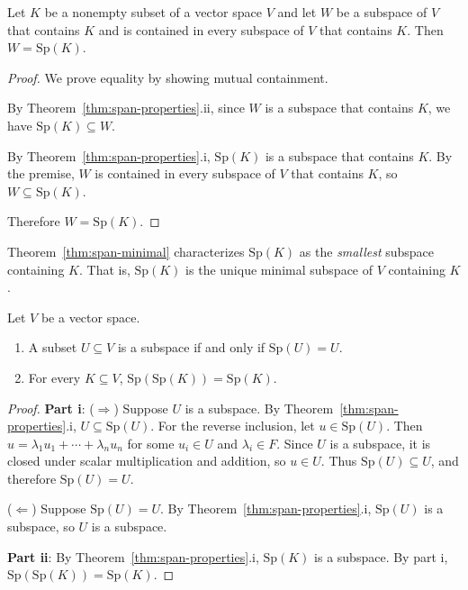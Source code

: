 \begin{theorem}\label{thm:span-minimal}
    Let $K$ be a nonempty subset of a vector space $V$ and let $W$ be a subspace of $V$ that contains $K$ and is contained in every subspace of $V$ that contains $K$. Then $W = \mathrm{Sp}(K)$.
\end{theorem}

\begin{proof}
    We prove equality by showing mutual containment.
    
    By Theorem~\ref{thm:span-properties}.ii, since $W$ is a subspace that contains $K$, we have $\mathrm{Sp}(K) \subseteq W$.
    
    By Theorem~\ref{thm:span-properties}.i, $\mathrm{Sp}(K)$ is a subspace that contains $K$. By the premise, $W$ is contained in every subspace of $V$ that contains $K$, so $W \subseteq \mathrm{Sp}(K)$.
    
    Therefore $W = \mathrm{Sp}(K)$.
\end{proof}

\begin{note}
    Theorem~\ref{thm:span-minimal} characterizes $\mathrm{Sp}(K)$ as the \textit{smallest} subspace containing $K$. That is, $\mathrm{Sp}(K)$ is the unique minimal subspace of $V$ containing $K$.
\end{note}

\begin{theorem*}\label{thm:span-operations}
    Let $V$ be a vector space.
    \begin{enumerate}[label=\roman*.]
        \item A subset $U \subseteq V$ is a subspace if and only if $\mathrm{Sp}(U) = U$.
        \item For every $K \subseteq V$, $\mathrm{Sp}(\mathrm{Sp}(K)) = \mathrm{Sp}(K)$.
    \end{enumerate}
\end{theorem*}

\begin{proof}
    \textbf{Part i}: ($\Rightarrow$) Suppose $U$ is a subspace. By Theorem~\ref{thm:span-properties}.i, $U \subseteq \mathrm{Sp}(U)$. For the reverse inclusion, let $u \in \mathrm{Sp}(U)$. Then $u = \lambda_1 u_1 + \cdots + \lambda_n u_n$ for some $u_i \in U$ and $\lambda_i \in F$. Since $U$ is a subspace, it is closed under scalar multiplication and addition, so $u \in U$. Thus $\mathrm{Sp}(U) \subseteq U$, and therefore $\mathrm{Sp}(U) = U$.
    
    ($\Leftarrow$) Suppose $\mathrm{Sp}(U) = U$. By Theorem~\ref{thm:span-properties}.i, $\mathrm{Sp}(U)$ is a subspace, so $U$ is a subspace.
    
    \textbf{Part ii}: By Theorem~\ref{thm:span-properties}.i, $\mathrm{Sp}(K)$ is a subspace. By part i, $\mathrm{Sp}(\mathrm{Sp}(K)) = \mathrm{Sp}(K)$.
\end{proof}

